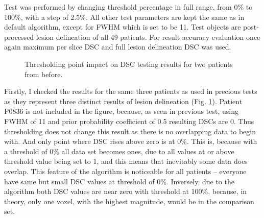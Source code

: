 \documentclass[12pt]{article}
\begin{document}
Test was performed by changing threshold percentage in full range, from 0\% to 100\%, with a step of 2.5\%. All other test parameters are kept the same as in default algorithm, except for FWHM which is set to be 11. Test objects are post-processed lesion delineation of all 49 patients. For result accuracy evaluation once again maximum per slice DSC and full lesion delineation DSC was used. 

\begin{figure}[!htb]
\centering
{}

\caption{Thresholding point impact on DSC testing results for two patients from before.}
\label{fig:cutoffs}
\end{figure}

Firstly, I checked the results for the same three patients as used in precious tests as they represent three distinct results of lesion delineation (Fig. \ref{fig:cutoffs}). Patient P0836 is not included in the figure, because, as seen in previous test, using FWHM of 11 and prior probability coefficient of 0.5 resulting DSCs are 0. Thus thresholding does not change this result as there is no overlapping data to begin with. And only point where DSC rises above zero is at 0\%. This is, because with a threshold of 0\% all data set becomes ones, due to all values at or above threshold value being set to 1, and this means that inevitably some data does overlap. This feature of the algorithm is noticeable for all patients – everyone have same but small DSC values at threshold of 0\%. Inversely, due to the algorithm both DSC values are near zero with threshold at 100\%, because, in theory, only one voxel, with the highest magnitude, would be in the comparison set.
\end{document}
